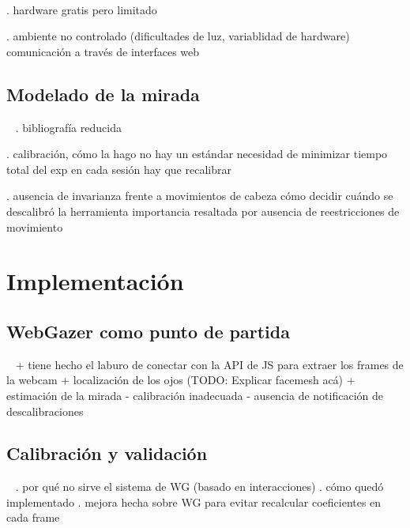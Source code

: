 \documentclass[aspectratio=169]{beamer}
\begin{document}
\begin{frame}{~}

. hardware gratis pero limitado

. ambiente no controlado (dificultades de luz, variablidad de hardware)
  comunicación a través de interfaces web

\end{frame}

\subsection{Modelado de la mirada}

\begin{frame}{~}
. bibliografía reducida

. calibración, cómo la hago
  no hay un estándar
  necesidad de minimizar tiempo total del exp
  en cada sesión hay que recalibrar

. ausencia de invarianza frente a movimientos de cabeza
  cómo decidir cuándo se descalibró la herramienta
  importancia resaltada por ausencia de reestricciones de movimiento
\end{frame}

\section{Implementación}

\subsection{WebGazer como punto de partida}

\begin{frame}{~}
+ tiene hecho el laburo de conectar con la API de JS para extraer los frames de
  la webcam
  + localización de los ojos (TODO: Explicar facemesh acá)
+ estimación de la mirada
- calibración inadecuada
- ausencia de notificación de descalibraciones
\end{frame}

\subsection{Calibración y validación}

\begin{frame}{~}
. por qué no sirve el sistema de WG (basado en interacciones)
. cómo quedó implementado
. mejora hecha sobre WG para evitar recalcular coeficientes en cada frame
\end{frame}
\end{document}
